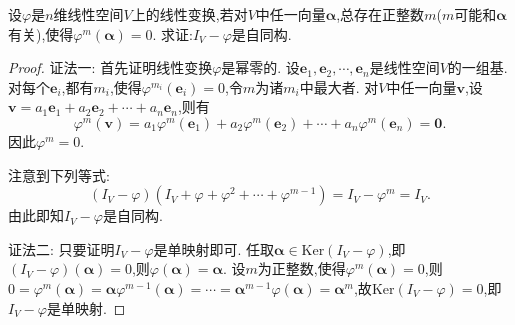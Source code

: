 \documentclass[../../main.tex]{subfiles}%
\begin{document}
\begin{example}
设\(\varphi\)是\(n\)维线性空间\(V\)上的线性变换,若对\(V\)中任一向量\(\boldsymbol{\alpha}\),总存在正整数\(m\)(\(m\)可能和\(\boldsymbol{\alpha}\)有关),使得\(\varphi^{m}(\boldsymbol{\alpha}) = 0\). 求证:\(I_V-\varphi\)是自同构.
\end{example}
\begin{proof}

{\color{blue}证法一:}
首先证明线性变换\(\varphi\)是幂零的. 设\(\boldsymbol{e}_1,\boldsymbol{e}_2,\cdots,\boldsymbol{e}_n\)是线性空间\(V\)的一组基. 对每个\(\boldsymbol{e}_i\),都有\(m_i\),使得\(\varphi^{m_i}(\boldsymbol{e}_i)=0\),令\(m\)为诸\(m_i\)中最大者. 对\(V\)中任一向量\(\boldsymbol{v}\),设\(\boldsymbol{v}=a_1\boldsymbol{e}_1 + a_2\boldsymbol{e}_2+\cdots + a_n\boldsymbol{e}_n\),则有
\[
\varphi^{m}(\boldsymbol{v})=a_1\varphi^{m}(\boldsymbol{e}_1)+a_2\varphi^{m}(\boldsymbol{e}_2)+\cdots + a_n\varphi^{m}(\boldsymbol{e}_n)=\boldsymbol{0}.
\]
因此\(\varphi^{m}=0\).

注意到下列等式:
\[
(I_V - \varphi)(I_V+\varphi+\varphi^{2}+\cdots+\varphi^{m - 1})=I_V-\varphi^{m}=I_V.
\]
由此即知\(I_V - \varphi\)是自同构.

{\color{blue}证法二:} 只要证明\(I_V - \varphi\)是单映射即可. 任取\(\boldsymbol{\alpha}\in\text{Ker}(I_V - \varphi)\),即\((I_V - \varphi)(\boldsymbol{\alpha}) = 0\),则\(\varphi(\boldsymbol{\alpha})=\boldsymbol{\alpha}\). 设\(m\)为正整数,使得\(\varphi^{m}(\boldsymbol{\alpha}) = 0\),则\(0=\varphi ^m(\boldsymbol{\alpha })=\boldsymbol{\alpha }\varphi ^{m-1}(\boldsymbol{\alpha })=\cdots =\boldsymbol{\alpha }^{m-1}\varphi (\boldsymbol{\alpha })=\boldsymbol{\alpha }^m\),故\(\text{Ker}(I_V - \varphi)=0\),即\(I_V - \varphi\)是单映射. 

\end{proof}
\end{document}
